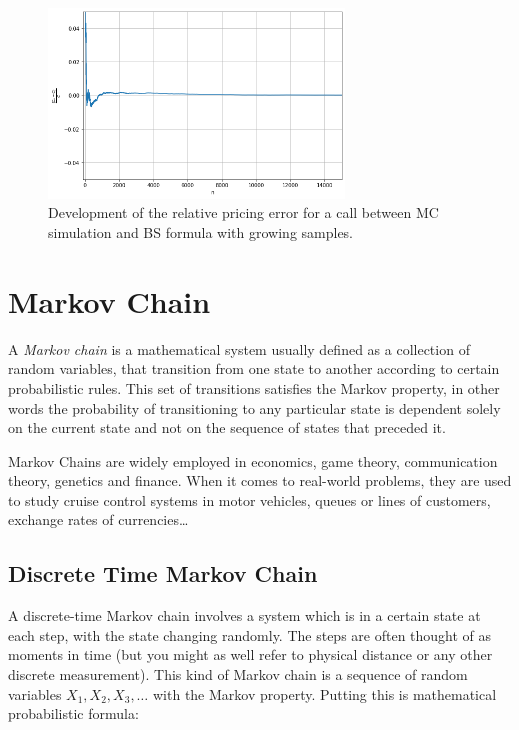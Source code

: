 \begin{figure}[htb]
\centering
\includegraphics[width=0.7\textwidth]{figures/call_pricing_error.png}
\caption{Development of the relative pricing error for a call between MC simulation and BS formula with growing samples.}
\label{fig:error_BS}
\end{figure}

\section{Markov Chain}
\label{sec:markov_chain}
A \emph{Markov chain} is a mathematical system usually defined as a collection of random variables, that transition from one state to another according to certain probabilistic rules. This set of transitions satisfies the Markov property, in other words the probability of transitioning to any particular state is dependent solely on the current state and not on the sequence of states that preceded it. 

Markov Chains are widely employed in economics, game theory, communication theory, genetics and finance. When it comes to real-world problems, they are used to study cruise control systems in motor vehicles, queues or lines of customers, exchange rates of currencies\ldots


\subsection{Discrete Time Markov Chain}
A discrete-time Markov chain involves a system which is in a certain state at each step, with the state changing randomly. The steps are often thought of as moments in time (but you might as well refer to physical distance or any other discrete measurement). This kind of Markov chain is a sequence of random variables $X_1, X_2, X_3,\ldots$ with the Markov property. Putting this is mathematical probabilistic formula:

